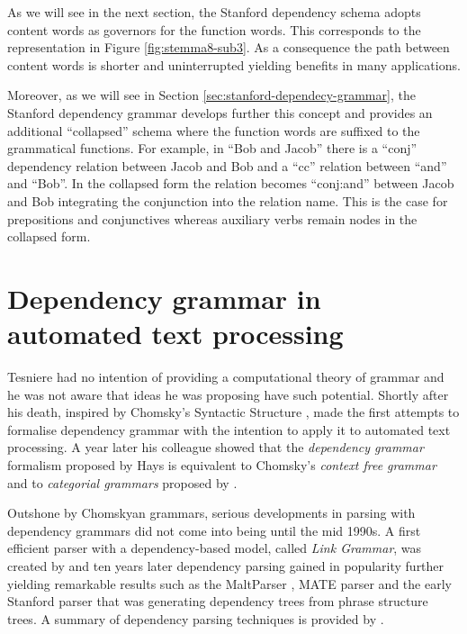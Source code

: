     As we will see in the next section, the Stanford dependency schema \citep{Marneffe2008,Marneffe2008a} adopts content words as governors for the function words. This corresponds to the representation in Figure \ref{fig:stemma8-sub3}. As a consequence the path between content words is shorter and uninterrupted yielding benefits in many applications.
    
    Moreover, as we will see in Section \ref{sec:stanford-dependecy-grammar}, the Stanford dependency grammar develops further this concept and provides an additional ``collapsed'' schema where the function words are suffixed to the grammatical functions. For example, in ``Bob and Jacob'' there is a ``conj'' dependency relation between Jacob and Bob and a ``cc'' relation between ``and'' and ``Bob''. In the collapsed form the relation becomes ``conj:and'' between Jacob and Bob integrating the conjunction into the relation name. This is the case for prepositions and conjunctives whereas auxiliary verbs remain nodes in the collapsed form. 

\section{Dependency grammar in automated text processing}
    Tesniere had no intention of providing a computational theory of grammar and he was not aware that ideas he was proposing have such potential. Shortly after his death, inspired by Chomsky's Syntactic Structure \citep{Chomsky57}, \citet{Hays1960,Hays1964} made the first attempts to formalise dependency grammar with the intention to apply it to automated text processing. A year later his colleague \citet{Gaifman1965} showed that the \textit{dependency grammar} formalism proposed by Hays is equivalent to Chomsky's \textit{context free grammar} and to \textit{categorial grammars} proposed by \citet{BarHillel53}.

    Outshone by Chomskyan grammars, serious developments in parsing with dependency grammars did not come into being until the mid 1990s. A first efficient parser with a dependency-based model, called \textit{Link Grammar}, was created by \citet{sleator1995parsing} and ten years later dependency parsing gained in popularity further yielding remarkable results such as the MaltParser \citep{Nivre2006,Nivre2007parser}, MATE parser \citep{Bohnet2010} and the early Stanford parser \citep{Marneffe2006} that was generating dependency trees from phrase structure trees. A summary of dependency parsing techniques is provided by \citet{kubler2009dependency}.

